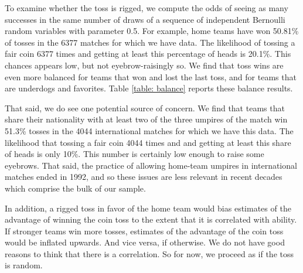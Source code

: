 \documentclass[11pt,  letterpaper]{article}
\begin{document}
To examine whether the toss is rigged, we compute the odds of seeing as many successes in the same number of draws of a sequence of independent Bernoulli random variables with parameter 0.5. For example, home teams have won 50.81\% of tosses in the 6377 matches for which we have data. The likelihood of tossing a fair coin 6377 times and getting at least this percentage of heads is 20.1\%. This chances appears low, but not eyebrow-raisingly so. We find that toss wins are even more balanced for teams that won and lost the last toss, and for teams that are underdogs and favorites. Table \ref{table: balance} reports these balance results. 

That said, we do see one potential source of concern. We find that teams that share their nationality with at least two of the three umpires of the match win 51.3\% tosses in the 4044 international matches for which we have this data. The likelihood that tossing a fair coin 4044 times and and getting at least this share of heads is only 10\%. This number is certainly low enough to raise some eyebrows. That said, the practice of allowing home-team umpires in international matches ended in 1992, and so these issues are less relevant in recent decades which comprise the bulk of our sample. 

In addition, a rigged toss in favor of the home team would bias estimates of the advantage of winning the coin toss to the extent that it is
correlated with ability. If stronger teams win more tosses, estimates of the advantage of the coin toss would be inflated upwards. And vice versa, if otherwise. We do not have good reasons to think that there is a correlation. So for now, we proceed as if the toss is random.












% 
\end{document}
